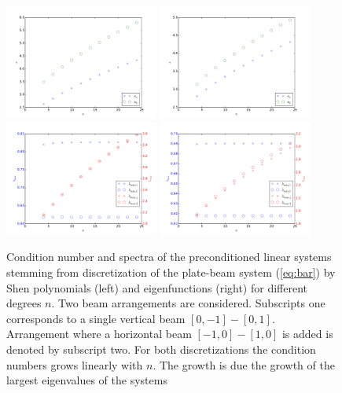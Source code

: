 \documentclass{marine_2015}
\begin{document}
 \begin{figure}[ht]
 \centering
 \includegraphics[width=0.45\textwidth]{img/Precond_shen_cond}
 \includegraphics[width=0.45\textwidth]{img/Precond_sine_cond}\\
 \includegraphics[width=0.45\textwidth]{img/prec_shen_spectrum}
 \includegraphics[width=0.45\textwidth]{img/prec_sine_spectrum}\\
 \caption{
 Condition number and spectra of the preconditioned linear systems stemming from
 discretization of the plate-beam system (\ref{eq:bar}) by Shen polynomials
 (left) and eigenfunctions (right) for different degrees $n$. Two beam arrangements 
 are considered. Subscripts one corresponds to a single vertical beam
 $\left[0, -1\right]-\left[0, 1\right]$. Arrangement where a horizontal beam 
$\left[-1, 0\right]-\left[1, 0\right]$ is added is denoted by subscript two.
For both discretizations the condition numbers grows linearly with $n$. The
growth is due the growth of the largest eigenvalues of the systems}
 \label{fig:precond}
 \end{figure}
\end{document}

